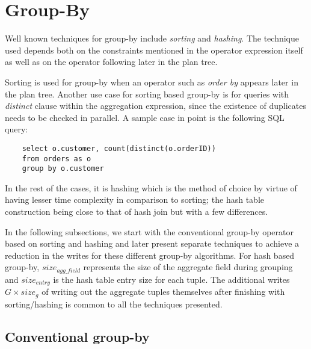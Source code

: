 \section{Group-By}%
\label{gby}

Well known techniques for group-by include \textit{sorting} and \textit{hashing}. The technique used depends both on the constraints mentioned in the operator expression itself as well as on the operator following later in the plan tree.


Sorting is used for group-by when an operator such as \textit{order by} appears later in the plan tree. Another use case for sorting based group-by is for queries with \textit{distinct} clause within the aggregation expression, since the existence of duplicates needs to be checked in parallel. A sample case in point is the following SQL query:
\begin{verbatim}
	select o.customer, count(distinct(o.orderID))
	from orders as o 
	group by o.customer
\end{verbatim}

\begin{comment}
In such a case, we can now no longer simply update the aggregate values in the hash table for group-by since the existence of duplicates needs to be checked in parallel. To get past this limitation, query optimisers usually choose to use sorting for aggregation. Since the group of tuples forming each aggregate now reside contiguously in the sorted list, duplicates can be identified easily and eliminated, while performing the aggregation.
\end{comment}

In the rest of the cases, it is hashing which is the method of choice by virtue of having lesser time complexity in comparison to sorting; the hash table construction being close to that of hash join but with a few differences.

In the following subsections, we start with the conventional group-by operator based on sorting and hashing and later present separate techniques to achieve a reduction in the writes for these different group-by algorithms. For hash based group-by, $size_{agg\_field}$ represents the size of the aggregate field during grouping and $size_{entry}$ is the hash table entry size for each tuple. The additional writes $G \times size_g$ of writing out the aggregate tuples themselves after finishing with sorting/hashing  is common to all the techniques presented.

\subsection{Conventional group-by}


